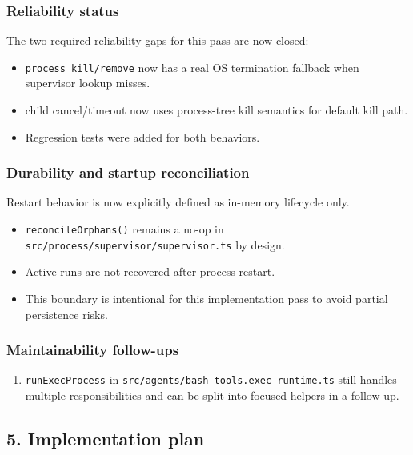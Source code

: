 \subsubsection{Reliability status}


The two required reliability gaps for this pass are now closed:

\begin{itemize}
  \item \texttt{process kill/remove} now has a real OS termination fallback when supervisor lookup misses.
  \item child cancel/timeout now uses process-tree kill semantics for default kill path.
  \item Regression tests were added for both behaviors.
\end{itemize}


\subsubsection{Durability and startup reconciliation}


Restart behavior is now explicitly defined as in-memory lifecycle only.

\begin{itemize}
  \item \texttt{reconcileOrphans()} remains a no-op in \texttt{src/process/supervisor/supervisor.ts} by design.
  \item Active runs are not recovered after process restart.
  \item This boundary is intentional for this implementation pass to avoid partial persistence risks.
\end{itemize}


\subsubsection{Maintainability follow-ups}


\begin{enumerate}
  \item \texttt{runExecProcess} in \texttt{src/agents/bash-tools.exec-runtime.ts} still handles multiple responsibilities and can be split into focused helpers in a follow-up.
\end{enumerate}


\subsection{5. Implementation plan}


